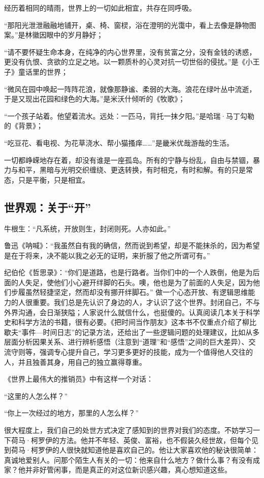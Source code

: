 \documentclass[openany,scheme = chinese, linespread = 1.5]{ctexbook}
\begin{document}
经历着相同的晴雨，世界上的一切如此相宜，共存在同呼吸。

   “那阳光泄泄融融地铺开，桌、椅、窗棂，浴在澄明的光霭中，看上去像是静物图案。”是林徽因眼中的岁月静好；
   
   “请不要怀疑生命本身，在纯净的内心世界里，没有贫富之分，没有金钱的诱惑，更没有仇恨、贪欲的立足之地。以一颗质朴的心灵对抗一切世俗的侵扰。”是《小王子》童话里的世界；
   
   “微风在园中唤起一阵阵花浪，就像那静谧、柔弱的大海。浪花在绿叶丛中流逝，于是又现出花园和绿色的大海。”是米沃什倾听的《牧歌》；
   
   “一个孩子站着。他望着流水。远处：一匹马，背托一抹夕阳。”是哈瑞·马丁勾勒的《背景》；
   
   “吃豆花、看电视、为花草浇水、帮小猫搔痒……”是畿米优哉游哉的生活。
   
一切都峥嵘地存在着，却没有谁是一座孤岛。所有的宁静与纷乱，自由与禁锢，暴力与和平，黑暗与光明交织缠绕、更迭转换，有时相克，有时和解。有的只是常态，只是平衡，只是相宜。

\subsection*{世界观：关于“开”}

    牛根生：“凡系统，开放则生，封闭则死。人亦如此。” 
    
    鲁迅《呐喊》：“我虽然自有我的确信，然而说到希望，却是不能抹杀的，因为希望是在于将来，决不能以我之必无的证明，来折服了他之所谓可有。”
    
纪伯伦《哲思录》：“你们是道路，也是行路者。当你们中的一个人跌倒，他是为后面的人失足，使他们小心避开绊脚的石头。噢，他也是为了前面的人失足，因为他们步履虽然轻捷坚定，然而却没有挪开绊脚石。”
做一个心态开放、有逻辑思维能力的人很重要。我们总是先认识了身边的人，才认识了这个世界。封闭自己，不与外界沟通，会日渐狭隘；人家说什么就信什么，也挺傻的。认真阅读几本关于科学史和科学方法的书籍，很有必要。《把时间当作朋友》这本书不仅重点介绍了柳比歇夫“事件—时间日志”的记录方法，还给出了一些逻辑问题的处理建议，比如从多层面分析因果关系、进行辨析感悟（注意到“道理”和“感悟”之间的巨大差异）、交流守则等，强调专心提升自己，学习更多更好的技能，成为一个值得他人交往的人，并且独善其身，用自己的独立赢得尊重。

   《世界上最伟大的推销员》中有这样一个对话：
   
   “这里的人怎么样？”
   
   “你上一次经过的地方，那里的人怎么样？”
   
很大程度上，我们自己的处世方式决定了感知到的世界对我们的态度。不妨学习一下荷马·柯罗伊的方法。他并不年轻、英俊、富裕，也不假装久经世故，但每个见到荷马·柯罗伊的人很快就知道他是喜欢自己的。他让大家喜欢他的秘诀很简单：真诚地爱别人。问那个陌生人有关的一切：他来自什么地方？做什么事？有没有成家？他并非好管闲事，而是真正的对这位新识感兴趣，真心想知道这些。
\end{document}
